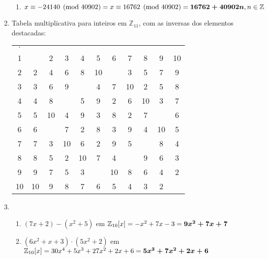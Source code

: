 \documentclass[fleqn]{../sftex/sftex}
\begin{document}
\begin{enumerate}[label= (\textbf{\arabic*})]
\begin{enumerate}
\item $x \equiv -24140 \pmod{40902} \\
= x \equiv 16762 \pmod{40902} \\
= \boldsymbol{16762 + 40902n}, n \in \mathbb{Z}$

\end{enumerate}

\item Tabela multiplicativa para inteiros em $\mathbb{Z}_{11}$, com as
inversas dos elementos destacadas:

\begin{tabular}{>{\color[gray]{0.35}}c *{10}{>{\color[gray]{0.8}}c}}
$\cdot$ & \color[gray]{0.35}{1} & \color[gray]{0.35}{2} &
\color[gray]{0.35}{3} & \color[gray]{0.35}{4} & \color[gray]{0.35}{5} &
\color[gray]{0.35}{6} & \color[gray]{0.35}{7} & \color[gray]{0.35}{8} &
\color[gray]{0.35}{9} & \color[gray]{0.35}{10} \\
1  & \color{black}{1} & 2 & 3 & 4 & 5 & 6 & 7 & 8 & 9 & 10 \\
2  & 2 & 4 & 6 & 8 & 10 & \color{black}{1} & 3 & 5 & 7 & 9 \\
3  & 3 & 6 & 9 & \color{black}{1} & 4 & 7 & 10 & 2 & 5 & 8 \\
4  & 4 & 8 & \color{black}{1} & 5 & 9 & 2 & 6 & 10 & 3 & 7 \\
5  & 5 & 10 & 4 & 9 & 3 & 8 & 2 & 7 & \color{black}{1} & 6 \\
6  & 6 & \color{black}{1} & 7 & 2 & 8 & 3 & 9 & 4 & 10 & 5 \\
7  & 7 & 3 & 10 & 6 & 2 & 9 & 5 & \color{black}{1} & 8 & 4 \\
8  & 8 & 5 & 2 & 10 & 7 & 4 & \color{black}{1} & 9 & 6 & 3 \\
9  & 9 & 7 & 5 & 3 & \color{black}{1} & 10 & 8 & 6 & 4 & 2 \\
10 & 10 & 9 & 8 & 7 & 6 & 5 & 4 & 3 & 2 & \color{black}{1} \\
\end{tabular}

\item

\begin{enumerate}

\item $(7x + 2) - (x^2 + 5)$ em $\mathbb{Z}_{10}[x] \\
= -x^2 + 7x - 3 \\
= \boldsymbol{9x^2 + 7x + 7}$

\item $(6x^2 + x + 3) \cdot (5x^2 + 2)$ em $\mathbb{Z}_{10}[x] \\
= 30x^4 + 5x^3 + 27x^2 + 2x + 6 \\
= \boldsymbol{5x^3 + 7x^2 + 2x + 6}$


\end{enumerate}
\end{enumerate}
\end{document}
